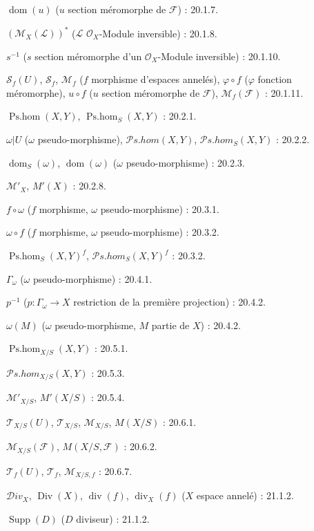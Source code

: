 $\operatorname{dom}(u)$ ($u$ section méromorphe de $\mathcal F$) : 20.1.7.

$(\mathcal M_X(\mathcal L))^{*}$
($\mathcal L$ $\mathcal O_X$-Module inversible) : 20.1.8.

$s^{-1}$ ($s$ section méromorphe d'un $\mathcal O_X$-Module inversible) : 20.1.10.

$\mathcal S_f(U)$, $\mathcal S_f$, $\mathcal M_f$
($f$ morphisme d'espaces annelés), $\varphi\circ f$ ($\varphi$ fonction méromorphe),
$u\circ f$ ($u$ section méromorphe de $\mathcal F$), $\mathcal M_f(\mathcal F)$ : 20.1.11.

$\operatorname{Ps.hom}(X,Y)$, $\operatorname{Ps.hom}_S(X,Y)$ : 20.2.1.

$\omega|U$ ($\omega$ pseudo-morphisme),
$\mathcal P\!s.\mathit{hom}(X,Y)$,
$\mathcal P\!s.\mathit{hom}_S(X,Y)$ : 20.2.2.

$\operatorname{dom}_S(\omega)$, $\operatorname{dom}(\omega)$
($\omega$ pseudo-morphisme) : 20.2.3.

$\mathcal M'_X$, $M'(X)$ : 20.2.8.

$f\circ\omega$ ($f$ morphisme, $\omega$ pseudo-morphisme) : 20.3.1.

$\omega\circ f$ ($f$ morphisme, $\omega$ pseudo-morphisme) : 20.3.2.

$\operatorname{Ps.hom}_S(X,Y)^f$,
$\mathcal P\!s.\mathit{hom}_S(X,Y)^f$ : 20.3.2.

$\Gamma_\omega$ ($\omega$ pseudo-morphisme) : 20.4.1.

$p^{-1}$ ($p:\Gamma_\omega\to X$ restriction de la première projection) : 20.4.2.

$\omega(M)$ ($\omega$ pseudo-morphisme, $M$ partie de $X$) : 20.4.2.

$\operatorname{Ps.hom}_{X/S}(X,Y)$ : 20.5.1.

$\mathcal P\!s.\mathit{hom}_{X/S}(X,Y)$ : 20.5.3.

$\mathcal M'_{X/S}$, $M'(X/S)$ : 20.5.4.

$\mathcal T_{X/S}(U)$, $\mathcal T_{X/S}$, $\mathcal M_{X/S}$,
$M(X/S)$ : 20.6.1.

$\mathcal M_{X/S}(\mathcal F)$, $M(X/S,\mathcal F)$ : 20.6.2.

$\mathcal T_f(U)$, $\mathcal T_f$, $\mathcal M_{X/S,f}$ : 20.6.7.

$\mathcal{D}iv_X$, $\operatorname{Div}(X)$, $\operatorname{div}(f)$,
$\operatorname{div}_X(f)$ ($X$ espace annelé) : 21.1.2.

$\operatorname{Supp}(D)$ ($D$ diviseur) : 21.1.2.

